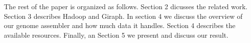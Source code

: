 
The rest of the paper is organized as follows. 
Section 2 dicusses the related work. 
Section 3 describes Hadoop and Giraph. 
In section 4 we discuss the overview of our genome assembler and how much data it handles. 
Section 4 describes the available resources. 
Finally, an Section 5 we present and discuss our result.



